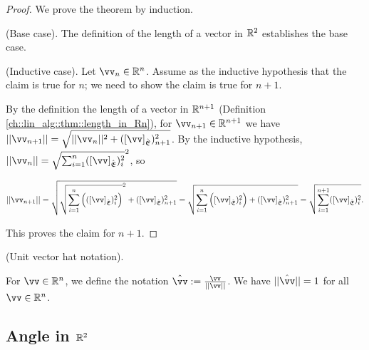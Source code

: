 \begin{proof}
    We prove the theorem by induction.

    (Base case). The definition of the length of a vector in $\mathbb{R}^2$ establishes the base case.

    (Inductive case). Let $\vv_n \in \R^n$. Assume as the inductive hypothesis that the claim is true for $n$; we need to show the claim is true for $n + 1$.

    By the definition the length of a vector in $\mathbb{R}^{n + 1}$ (Definition \ref{ch::lin_alg::thm::length_in_Rn}), for $\vv_{n + 1} \in \R^{n + 1}$ we have \\ ${||\vv_{n + 1}|| = \sqrt{||\vv_n||^2 + ([\vv]_\sE)_{n + 1}^2}}$. By the inductive hypothesis, $||\vv_n|| = \sqrt{\sum_{i = 1}^n ([\vv]_\sE)_i^2}^2$, so

    \begin{align*}
        ||\vv_{n + 1}|| = \sqrt{\sqrt{\sum_{i = 1}^n \Big(([\vv]_\sE)_i^2\Big)}^2 + ([\vv]_\sE)_{n + 1}^2} = \sqrt{\sum_{i = 1}^n \Big([\vv]_\sE)_i^2\Big) + ([\vv]_\sE)_{n + 1}^2} = \sqrt{\sum_{i = 1}^{n + 1} ([\vv]_\sE)_i^2}.
    \end{align*}

    This proves the claim for $n + 1$.
\end{proof}

\begin{defn}
\label{ch::lin_alg::defn::unit_vector_hat_notation}
    (Unit vector hat notation). 
    
    For $\vv \in \R^n$, we define the notation $\hat{\vv} := \frac{\vv}{||\vv||}$. We have $||\hat{\vv}|| = 1$ for all $\vv \in \R^n$.
\end{defn}

\subsection*{Angle in $\mathbb{R}^2$}

